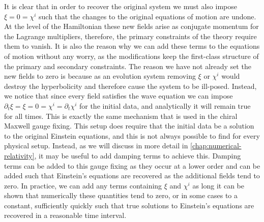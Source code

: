 \documentclass[10pt]{report}
\theoremstyle{definition}
\begin{document}
        It is clear that in order to recover the original system we must also impose $\xi = 0 = \chi^i$ such that the changes to the original equations of motion are undone. At the level of the Hamiltonian these new fields arise as conjugate momentum for the Lagrange multipliers, therefore, the primary constraints of the theory require them to vanish. It is also the reason why we can add these terms to the equations of motion without any worry, as the modifications keep the first-class structure of the primary and secondary constraints. The reason we have not already set the new fields to zero is because as an evolution system removing $\xi$ or $\chi^i$ would destroy the hyperbolicity and therefore cause the system to be ill-posed. Instead, we notice that since every field satisfies the wave equation we can impose $\partial_t \xi = \xi = 0 = \chi^i = \partial_t \chi^i$ for the initial data, and analytically it will remain true for all times. This is exactly the same mechanism that is used in the chiral Maxwell gauge fixing. This setup does require that the initial data be a solution to the original Einstein equations, and this is not always possible to find for every physical setup. Instead, as we will discuss in more detail in \cref{chap:numerical-relativity}, it may be useful to add damping terms to achieve this. Damping terms can be added to this gauge fixing as they occur at a lower order and can be added such that Einstein's equations are recovered as the additional fields tend to zero. In practice, we can add any terms containing $\xi$ and $\chi^i$ as long it can be shown that numerically these quantities tend to zero, or in some cases to a constant, sufficiently quickly such that true solutions to Einstein's equations are recovered in a reasonable time interval.
\end{document}
